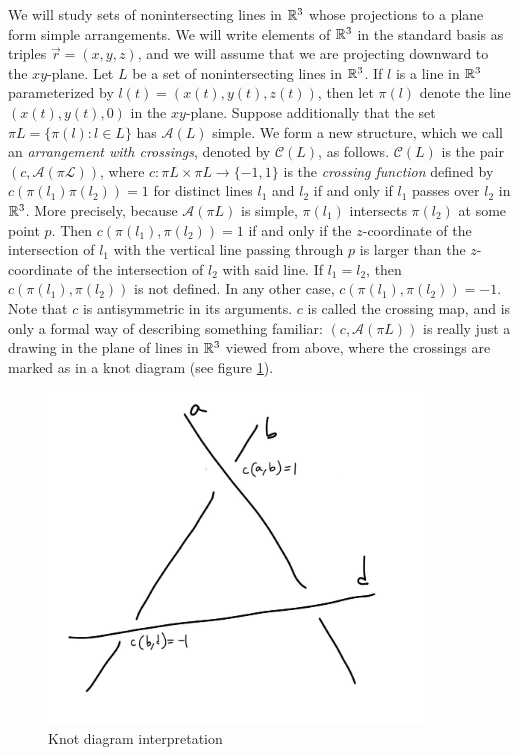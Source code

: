 \documentclass[11pt, oneside]{article}
\begin{document}
We will study sets of nonintersecting lines in $\mathbb{R}^3$ whose projections to a plane form simple arrangements. We will write elements of $\mathbb{R}^3$ in the standard basis as triples $\vec{r} = (x, y, z)$, and we will assume that we are projecting downward to the $xy$-plane. Let $L$ be a set of nonintersecting lines in $\mathbb{R}^3$. If $l$ is a line in $\mathbb{R}^3$ parameterized by $l(t) = (x(t), y(t), z(t))$, then let $\pi(l)$ denote the line $(x(t), y(t), 0)$ in the $xy$-plane. Suppose additionally that the set $\pi L = \{\pi(l): l \in L\}$ has $\mathcal{A}(L)$ simple. We form a new structure, which we call an \emph{arrangement with crossings}, denoted by $\mathcal{C}(L)$, as follows. 
$\mathcal{C}(L)$ is the pair $(c, \mathcal{A(\pi L)})$, where $c: \pi L \times \pi L \to \{-1, 1\}$ is the \emph{crossing function} defined by $c(\pi(l_1) \pi(l_2)) = 1$ for distinct lines $l_1$ and $l_2$ if and only if $l_1$ passes over $l_2$ in $\mathbb{R}^3$. More precisely, because $\mathcal{A}(\pi L)$ is simple, $\pi(l_1)$ intersects $\pi(l_2)$ at some point $p$. Then $c(\pi(l_1), \pi(l_2)) = 1$ if and only if the $z$-coordinate of the intersection of $l_1$ with the vertical line passing through $p$ is larger than the $z$-coordinate of the intersection of $l_2$ with said line. If $l_1 = l_2$, then $c(\pi(l_1), \pi(l_2))$ is not defined. In any other case, $c(\pi(l_1), \pi(l_2)) = -1$. Note that $c$ is antisymmetric in its arguments. $c$ is called the crossing map, and is only a formal way of describing something familiar: $(c, \mathcal{A}(\pi L))$ is really just a drawing in the plane of lines in $\mathbb{R}^3$ viewed from above, where the crossings are marked as in a knot diagram (see figure \ref{fig:first}). \\

\begin{figure}
\begin{minipage}{\linewidth}
\centering	
\includegraphics[width=0.9\textwidth]{Arrcross.jpeg}
\caption{Knot diagram interpretation}
\label{fig:first}
\end{minipage}
\end{figure}
\end{document}
